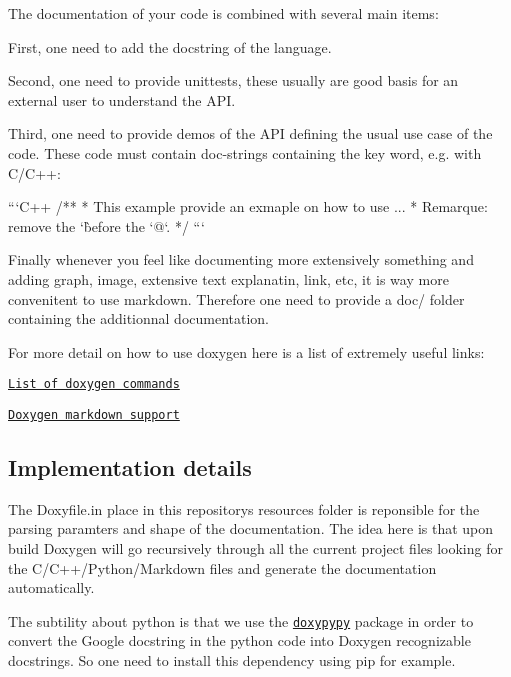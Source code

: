 The documentation of your code is combined with several main items\+:


\begin{DoxyItemize}
\item First, one need to add the docstring of the language.
\item Second, one need to provide unittests, these usually are good basis for an external user to understand the A\+PI.
\item Third, one need to provide demos of the A\+PI defining the usual use case of the code. These code must contain doc-\/strings containing the key word, e.\+g. with C/\+C++\+: \begin{DoxyVerb}```C++
/** 
  *  This example provide an exmaple on how to use ...
  * Remarque: remove the `\` before the `@`.
  */
```
\end{DoxyVerb}

\item Finally whenever you feel like documenting more extensively something and adding graph, image, extensive text explanatin, link, etc, it is way more convenitent to use markdown. Therefore one need to provide a {\ttfamily doc/} folder containing the additionnal documentation.
\end{DoxyItemize}

For more detail on how to use doxygen here is a list of extremely useful links\+:
\begin{DoxyItemize}
\item \href{http://doxygen.nl/manual/commands.html}{\tt List of doxygen commands}
\item \href{http://doxygen.nl/manual/markdown.html#markdown_dox}{\tt Doxygen markdown support}
\end{DoxyItemize}

\subsection*{Implementation details}

The {\ttfamily Doxyfile.\+in} place in this repository\textquotesingle{}s {\ttfamily resources} folder is reponsible for the parsing paramters and shape of the documentation. The idea here is that upon build Doxygen will go recursively through all the current project files looking for the C/\+C++/\+Python/\+Markdown files and generate the documentation automatically.

The subtility about python is that we use the \href{https://github.com/Feneric/doxypypy}{\tt doxypypy} package in order to convert the Google docstring in the python code into Doxygen recognizable docstrings. So one need to install this dependency using pip for example. 
